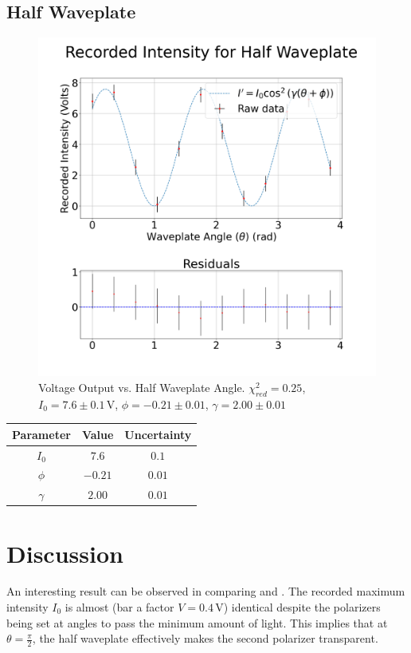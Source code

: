 \documentclass[aip, cp, amsmath, amssymb, reprint]{revtex4-2}
\begin{document}
        \subsection{Half Waveplate}
            \begin{figure}[H]
                \centering
                \includegraphics[width=0.9\linewidth]{../figures/Half.png}
                \caption{Voltage Output vs. Half Waveplate Angle. $\chi_{red}^2 = 0.25$, $I_0 = 7.6 \pm 0.1\,\text{V}$, $\phi = -0.21 \pm 0.01$, $\gamma = 2.00 \pm 0.01$}
                \label{fig:part2b}
            \end{figure}


            \begin{table}[H]
                \centering
                \begin{tabular}{c|c|c}
                    \bfseries Parameter & \bfseries Value & \bfseries Uncertainty \\
                    \hline
                    $I_0$ & $7.6$ & $0.1$ \\
                    $\phi$ & $-0.21$ & $0.01$ \\
                    $\gamma$ & $2.00$ & $0.01$ \\
                \end{tabular}
            \end{table}

    
    \section{Discussion}
        An interesting result can be observed in comparing  and . The recorded maximum intensity $I_0$ is almost (bar a factor $V = 0.4\,\text{V}$) identical despite the polarizers being set at angles to pass the minimum amount of light. This implies that at $\theta = \frac{\pi}{2}$, the half waveplate effectively makes the second polarizer transparent.
\end{document}
